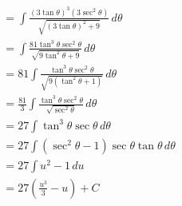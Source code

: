 \documentclass[preview]{standalone}
\begin{document}
\begin{align*}
&= \int \frac{(3\tan\theta)^3(3\sec^2\theta)}{\sqrt{(3\tan\theta)^2+9}} \, d\theta \\ &= \int \frac{81\tan^3\theta\sec^2\theta}{\sqrt{9\tan^2\theta+9}} \, d\theta \\ &= 81\int \frac{\tan^3\theta\sec^2\theta}{\sqrt{9(\tan^2\theta+1)}} \, d\theta \\ &= \frac{81}{3}\int \frac{\tan^3\theta\sec^2\theta}{\sqrt{\sec^2\theta}} \, d\theta \\ &= 27\int \tan^3\theta\sec\theta \, d\theta \\ &= 27\int (\sec^2\theta-1)\sec\theta\tan\theta \, d\theta \\ &=27\int u^2-1 \, du \\ &=27(\frac{u^3}{3}-u)+C
\end{align*}
\end{document}
